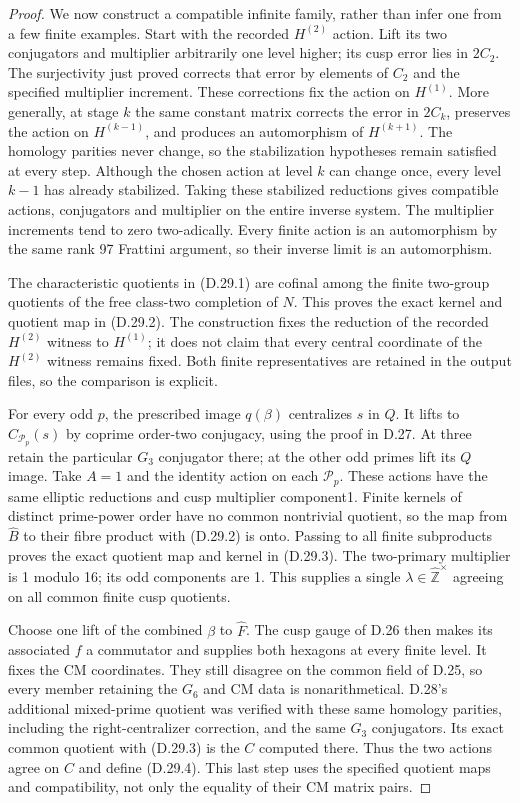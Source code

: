 \begin{proof}
We now construct a compatible infinite family, rather
than infer one from a few finite examples. Start with
the recorded $H^{(2)}$ action. Lift its two conjugators
and multiplier arbitrarily one level higher; its cusp
error lies in $2C_2$. The surjectivity just proved
corrects that error by elements of $C_2$ and the
specified multiplier increment. These corrections
fix the action on $H^{(1)}$. More generally, at stage
$k$ the same constant matrix corrects the error in
$2C_k$, preserves the action on $H^{(k-1)}$, and
produces an automorphism of $H^{(k+1)}$. The homology
parities never change, so the stabilization hypotheses
remain satisfied at every step. Although the chosen
action at level $k$ can change once, every level $k-1$
has already stabilized. Taking these stabilized
reductions gives compatible actions, conjugators and
multiplier on the entire inverse system. The multiplier
increments tend to zero two-adically. Every finite
action is an automorphism by the same rank 97 Frattini
argument, so their inverse limit is an automorphism.

The characteristic quotients in (D.29.1) are cofinal
among the finite two-group quotients of the free
class-two completion of $N$. This proves the exact
kernel and quotient map in (D.29.2). The construction
fixes the reduction of the recorded $H^{(2)}$ witness
to $H^{(1)}$; it does not claim that every central
coordinate of the $H^{(2)}$ witness remains fixed.
Both finite representatives are retained in the
output files, so the comparison is explicit.

For every odd $p$, the prescribed image $q(\beta)$
centralizes $s$ in $Q$. It lifts to
$C_{\mathcal P_p}(s)$ by coprime order-two conjugacy,
using the proof in D.27. At three retain the particular
$G_3$ conjugator there; at the other odd primes lift
its $Q$ image. Take $A=1$ and the identity action on
each $\mathcal P_p$. These actions have the same
elliptic reductions and cusp multiplier component1.
Finite kernels of distinct prime-power order have no
common nontrivial quotient, so the map from $\widehat B$
to their fibre product with (D.29.2) is onto. Passing
to all finite subproducts proves the exact quotient
map and kernel in (D.29.3).
The two-primary multiplier is 1 modulo 16; its odd
components are 1. This supplies a single
$\lambda\in\widehat{\mathbb Z}^{\times}$ agreeing on
all common finite cusp quotients.

Choose one lift of the combined $\beta$ to $\widehat F$.
The cusp gauge of D.26 then makes its associated $f$
a commutator and supplies both hexagons at every finite
level. It fixes the CM coordinates. They still disagree
on the common field of D.25, so every member retaining the $G_6$ and CM data
is nonarithmetical. D.28's additional mixed-prime
quotient was verified with these same homology parities,
including the right-centralizer correction, and the
same $G_3$ conjugators. Its exact common quotient with
(D.29.3) is the $C$ computed there. Thus the two actions
agree on $C$ and define (D.29.4). This last step uses
the specified quotient maps and compatibility, not
only the equality of their CM matrix pairs.
\end{proof}
